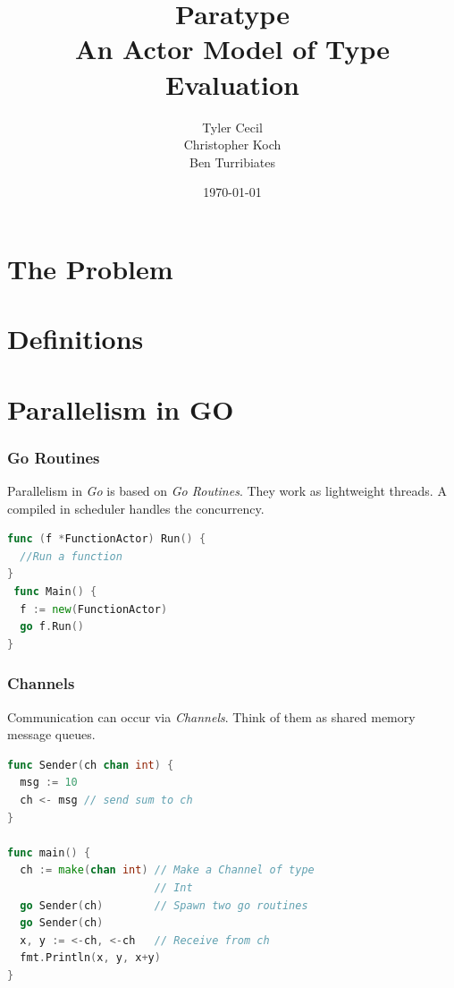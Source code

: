 \documentclass{beamer}
\begin{document}
\title[Paratype]{Paratype \\ An Actor Model of Type Evaluation}
\author{Tyler Cecil \\ Christopher Koch \\ Ben Turribiates}
\date{\today}

\frame{\titlepage}

\section{The Problem}





\section{Definitions}


\section{Parallelism in GO}


\begin{frame}[fragile]
  \frametitle{Go Routines}

  Parallelism in \emph{Go} is based on \emph{Go Routines}. They work
  as lightweight threads. A compiled in scheduler handles the
  concurrency.

  \begin{lstlisting}[language=Go]
func (f *FunctionActor) Run() {
  //Run a function
}
 func Main() {
  f := new(FunctionActor)
  go f.Run()
}
  \end{lstlisting}
\end{frame}

\begin{frame}[fragile]
  \frametitle{Channels}
  
  Communication can occur via \emph{Channels}. Think of them as shared
  memory message queues.

  \begin{lstlisting}[language=Go]
func Sender(ch chan int) {
  msg := 10 
  ch <- msg // send sum to ch
}

func main() {
  ch := make(chan int) // Make a Channel of type 
                       // Int
  go Sender(ch)        // Spawn two go routines
  go Sender(ch)
  x, y := <-ch, <-ch   // Receive from ch
  fmt.Println(x, y, x+y)
}
  \end{lstlisting}
\end{frame}
\end{document}
